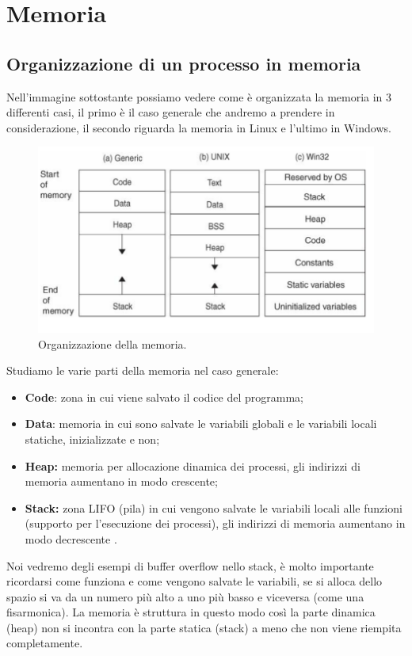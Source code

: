 \section{Memoria}
\subsection{Organizzazione di un processo in memoria}
Nell'immagine sottostante possiamo vedere come è organizzata la memoria in 3 differenti casi, il primo è il caso generale che andremo a prendere in considerazione, il secondo riguarda la memoria in Linux e l'ultimo in Windows.

\begin{figure}[H]
	\centering
    \includegraphics[width=14cm, keepaspectratio]{santini/img/cap_2/memoria.png}
	\caption{Organizzazione della memoria.}\label{fig:org_memoria}
\end{figure}
Studiamo le varie parti della memoria nel caso generale:
\begin{itemize}
    \item \textbf{Code}: zona in cui viene salvato il codice del programma;
    \item \textbf{Data}: memoria  in cui sono salvate le variabili globali e le variabili locali statiche, inizializzate e non;
    \item \textbf{Heap:} memoria per allocazione dinamica dei processi, gli indirizzi di memoria aumentano in modo crescente;
    \item \textbf{Stack:} zona LIFO (pila) in cui vengono salvate le variabili locali alle funzioni (supporto per l'esecuzione dei processi), gli indirizzi di memoria aumentano in modo decrescente .
\end{itemize}
Noi vedremo degli esempi di buffer overflow nello stack, è molto importante ricordarsi come funziona e come vengono salvate le variabili, se si alloca dello spazio si va da un numero più alto a uno più basso e viceversa (come una fisarmonica). La memoria è struttura in questo modo così la parte dinamica (heap) non si incontra con la parte statica (stack) a meno che non viene riempita completamente.\\
